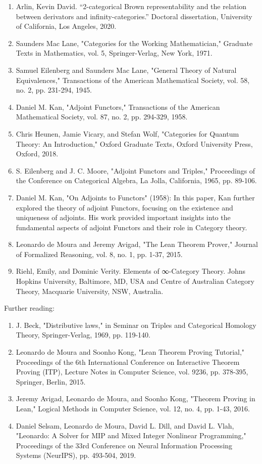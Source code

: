 \documentclass{book}
\begin{document}
\begin{enumerate}
\item Arlin, Kevin David. ``2-categorical Brown representability and the relation between derivators and infinity-categories.'' Doctoral dissertation, University of California, Los Angeles, 2020.
\item Saunders Mac Lane, "Categories for the Working Mathematician," Graduate Texts in Mathematics, vol. 5, Springer-Verlag, New York, 1971.
\item Samuel Eilenberg and Saunders Mac Lane, "General Theory of Natural Equivalences," Transactions of the American Mathematical Society, vol. 58, no. 2, pp. 231-294, 1945.
\item Daniel M. Kan, "Adjoint Functors," Transactions of the American Mathematical Society, vol. 87, no. 2, pp. 294-329, 1958.
\item Chris Heunen, Jamie Vicary, and Stefan Wolf, "Categories for Quantum Theory: An Introduction," Oxford Graduate Texts, Oxford University Press, Oxford, 2018.
\item S. Eilenberg and J. C. Moore, "Adjoint Functors and Triples," Proceedings of the Conference on Categorical Algebra, La Jolla, California, 1965, pp. 89-106.
\item Daniel M. Kan, "On Adjoints to Functors" (1958): In this paper, Kan further explored the theory of adjoint Functors, focusing on the existence and uniqueness of adjoints. His work provided important insights into the fundamental aspects of adjoint Functors and their role in Category theory.
\item Leonardo de Moura and Jeremy Avigad, "The Lean Theorem Prover," Journal of Formalized Reasoning, vol. 8, no. 1, pp. 1-37, 2015.
\item Riehl, Emily, and Dominic Verity. Elements of ∞-Category Theory. Johns Hopkins University, Baltimore, MD, USA and Centre of Australian Category Theory, Macquarie University, NSW, Australia.
\end{enumerate}

Further reading:

\begin{enumerate}
\item J. Beck, "Distributive laws," in Seminar on Triples and Categorical Homology Theory, Springer-Verlag, 1969, pp. 119-140.
\item Leonardo de Moura and Soonho Kong, "Lean Theorem Proving Tutorial," Proceedings of the 6th International Conference on Interactive Theorem Proving (ITP), Lecture Notes in Computer Science, vol. 9236, pp. 378-395, Springer, Berlin, 2015.
\item Jeremy Avigad, Leonardo de Moura, and Soonho Kong, "Theorem Proving in Lean," Logical Methods in Computer Science, vol. 12, no. 4, pp. 1-43, 2016.
\item Daniel Selsam, Leonardo de Moura, David L. Dill, and David L. Vlah, "Leonardo: A Solver for MIP and Mixed Integer Nonlinear Programming," Proceedings of the 33rd Conference on Neural Information Processing Systems (NeurIPS), pp. 493-504, 2019.
\end{enumerate}
\end{document}
